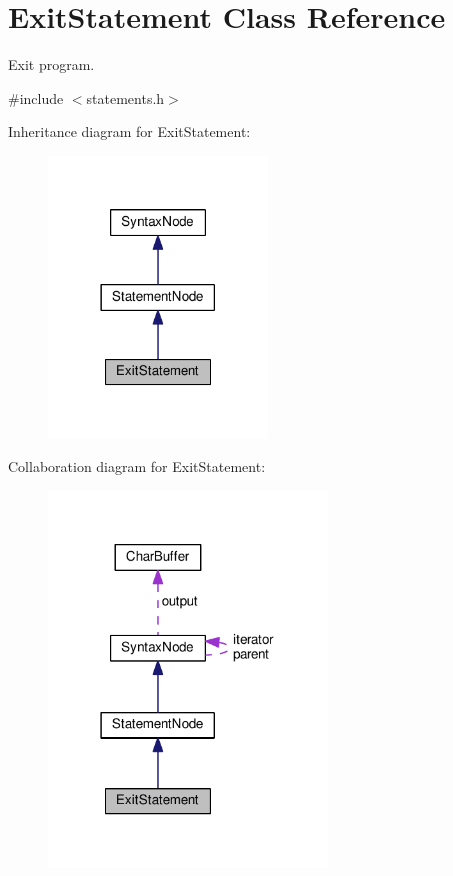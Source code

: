 \hypertarget{classExitStatement}{}\section{Exit\+Statement Class Reference}
\label{classExitStatement}


Exit program.  




{\ttfamily \#include $<$statements.\+h$>$}



Inheritance diagram for Exit\+Statement\+:
\nopagebreak
\begin{figure}[H]
\begin{center}
\leavevmode
\includegraphics[width=165pt]{df/dc9/classExitStatement__inherit__graph}
\end{center}
\end{figure}


Collaboration diagram for Exit\+Statement\+:
\nopagebreak
\begin{figure}[H]
\begin{center}
\leavevmode
\includegraphics[width=210pt]{d8/d0b/classExitStatement__coll__graph}
\end{center}
\end{figure}

